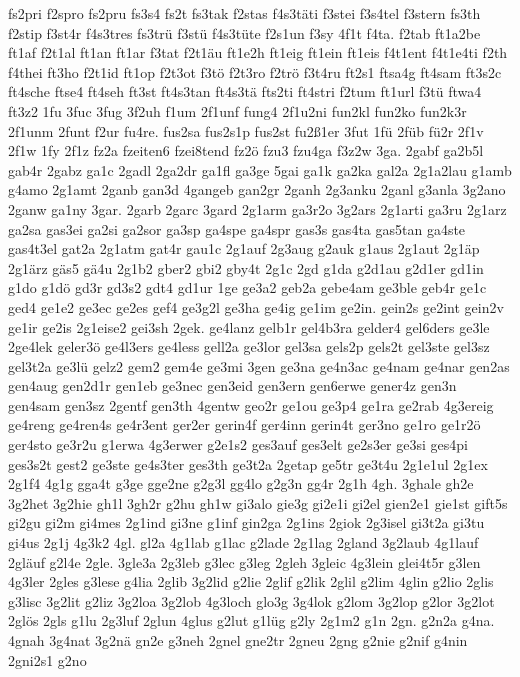 {fs2pri
f2spro
fs2pru
fs3s4
fs2t
fs3tak
f2stas
f4s3täti
f3stei
f3s4tel
f3stern
fs3th
f2stip
f3st4r
f4s3tres
fs3trü
f3stü
f4s3tüte
f2s1un
f3sy
4f1t
f4ta.
f2tab
ft1a2be
ft1af
f2t1al
ft1an
ft1ar
f3tat
f2t1äu
ft1e2h
ft1eig
ft1ein
ft1eis
f4t1ent
f4t1e4ti
f2th
f4thei
ft3ho
f2t1id
ft1op
f2t3ot
f3tö
f2t3ro
f2trö
f3t4ru
ft2s1
ftsa4g
ft4sam
ft3s2c
ft4sche
ftse4
ft4seh
ft3st
ft4s3tan
ft4s3tä
fts2ti
ft4stri
f2tum
ft1url
f3tü
ftwa4
ft3z2
1fu
3fuc
3fug
3f2uh
f1um
2f1unf
fung4
2f1u2ni
fun2kl
fun2ko
fun2k3r
2f1unm
2funt
f2ur
fu4re.
fus2sa
fus2s1p
fus2st
fu2ß1er
3fut
1fü
2füb
fü2r
2f1v
2f1w
1fy
2f1z
fz2a
fzeiten6
fzei8tend
fz2ö
fzu3
fzu4ga
f3z2w
3ga.
2gabf
ga2b5l
gab4r
2gabz
ga1c
2gadl
2ga2dr
ga1fl
ga3ge
5gai
ga1k
ga2ka
gal2a
2g1a2lau
g1amb
g4amo
2g1amt
2ganb
gan3d
4gangeb
gan2gr
2ganh
2g3anku
2ganl
g3anla
3g2ano
2ganw
ga1ny
3gar.
2garb
2garc
3gard
2g1arm
ga3r2o
3g2ars
2g1arti
ga3ru
2g1arz
ga2sa
gas3ei
ga2si
ga2sor
ga3sp
ga4spe
ga4spr
gas3s
gas4ta
gas5tan
ga4ste
gas4t3el
gat2a
2g1atm
gat4r
gau1c
2g1auf
2g3aug
g2auk
g1aus
2g1aut
2g1äp
2g1ärz
gäs5
gä4u
2g1b2
gber2
gbi2
gby4t
2g1c
2gd
g1da
g2d1au
g2d1er
gd1in
g1do
g1dö
gd3r
gd3s2
gdt4
gd1ur
1ge
ge3a2
geb2a
gebe4am
ge3ble
geb4r
ge1c
ged4
ge1e2
ge3ec
ge2es
gef4
ge3g2l
ge3ha
ge4ig
ge1im
ge2in.
gein2s
ge2int
gein2v
ge1ir
ge2is
2g1eise2
gei3sh
2gek.
ge4lanz
gelb1r
gel4b3ra
gelder4
gel6ders
ge3le
2ge4lek
geler3ö
ge4l3ers
ge4less
gell2a
ge3lor
gel3sa
gels2p
gels2t
gel3ste
gel3sz
gel3t2a
ge3lü
gelz2
gem2
gem4e
ge3mi
3gen
ge3na
ge4n3ac
ge4nam
ge4nar
gen2as
gen4aug
gen2d1r
gen1eb
ge3nec
gen3eid
gen3ern
gen6erwe
gener4z
gen3n
gen4sam
gen3sz
2gentf
gen3th
4gentw
geo2r
ge1ou
ge3p4
ge1ra
ge2rab
4g3ereig
ge4reng
ge4ren4s
ge4r3ent
ger2er
gerin4f
ger4inn
gerin4t
ger3no
ge1ro
ge1r2ö
ger4sto
ge3r2u
g1erwa
4g3erwer
g2e1s2
ges3auf
ges3elt
ge2s3er
ge3si
ges4pi
ges3s2t
gest2
ge3ste
ge4s3ter
ges3th
ge3t2a
2getap
ge5tr
ge3t4u
2g1e1ul
2g1ex
2g1f4
4g1g
gga4t
g3ge
gge2ne
g2g3l
gg4lo
g2g3n
gg4r
2g1h
4gh.
3ghale
gh2e
3g2het
3g2hie
gh1l
3gh2r
g2hu
gh1w
gi3alo
gie3g
gi2e1i
gi2el
gien2e1
gie1st
gift5s
gi2gu
gi2m
gi4mes
2g1ind
gi3ne
g1inf
gin2ga
2g1ins
2giok
2g3isel
gi3t2a
gi3tu
gi4us
2g1j
4g3k2
4gl.
gl2a
4g1lab
g1lac
g2lade
2g1lag
2gland
3g2laub
4g1lauf
2gläuf
g2l4e
2gle.
3gle3a
2g3leb
g3lec
g3leg
2gleh
3gleic
4g3lein
glei4t5r
g3len
4g3ler
2gles
g3lese
g4lia
2glib
3g2lid
g2lie
2glif
g2lik
2glil
g2lim
4glin
g2lio
2glis
g3lisc
3g2lit
g2liz
3g2loa
3g2lob
4g3loch
glo3g
3g4lok
g2lom
3g2lop
g2lor
3g2lot
2glös
2gls
g1lu
2g3luf
2glun
4glus
g2lut
g1lüg
g2ly
2g1m2
g1n
2gn.
g2n2a
g4na.
4gnah
3g4nat
3g2nä
gn2e
g3neh
2gnel
gne2tr
2gneu
2gng
g2nie
g2nif
g4nin
2gni2s1
g2no
}
